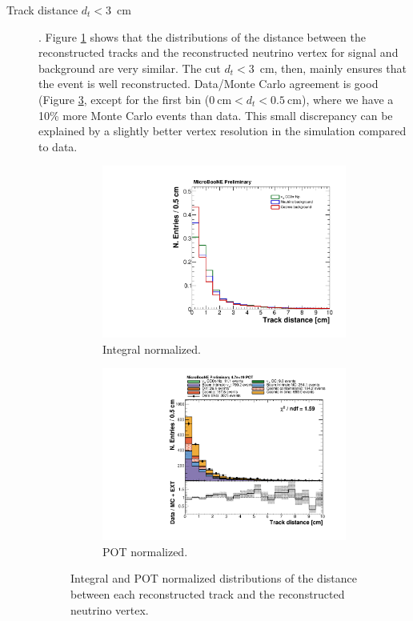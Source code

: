 \begin{description}
\item[Track distance $d_{t} < 3$~cm]. Figure \ref{fig:track_norm} shows that the distributions of the distance between the reconstructed tracks and the reconstructed neutrino vertex for signal and background are very similar. The cut $d_{t} < 3$~cm, then, mainly ensures that the event is well reconstructed. Data/Monte Carlo agreement is good (Figure \ref{fig:track_pot}, except for the first bin ($0~\mathrm{cm} < d_{t} < 0.5~\mathrm{cm}$), where we have a 10\% more Monte Carlo events than data. This small discrepancy can be explained by a slightly better vertex resolution in the simulation compared to data.

\begin{figure}[htbp]
\centering
  \begin{subfigure}{0.45\textwidth}
    \includegraphics[width=\linewidth]{figures/h_track_distance_norm.pdf}
    \caption{Integral normalized.} \label{fig:track_norm}
  \end{subfigure}
    \begin{subfigure}{0.45\textwidth}
    \includegraphics[width=\linewidth]{figures/h_track_distance.pdf}
    \caption{POT normalized.} \label{fig:track_pot}
  \end{subfigure}
  \caption{Integral and POT normalized distributions of the distance between each reconstructed track and the reconstructed neutrino vertex.}
\end{figure}


\end{description}
